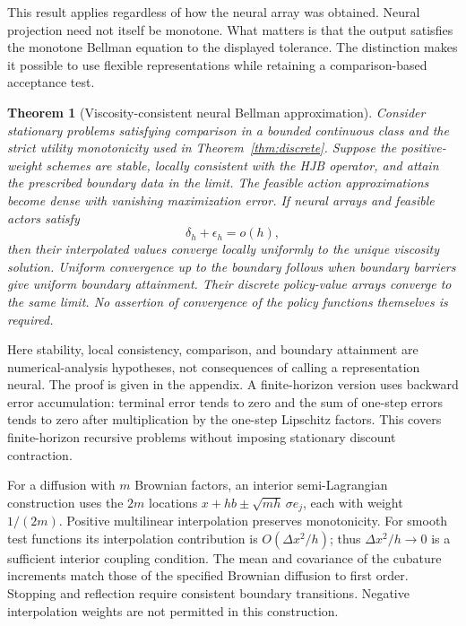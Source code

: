 \documentclass[ecta,nameyear,draft]{econsocart}
\newtheorem{theorem}{Theorem}
\theoremstyle{definition}
\theoremstyle{remark}
\begin{document}
This result applies regardless of how the neural array was obtained. Neural projection need not itself be monotone. What matters is that the output satisfies the monotone Bellman equation to the displayed tolerance. The distinction makes it possible to use flexible representations while retaining a comparison-based acceptance test.

\begin{theorem}[Viscosity-consistent neural Bellman approximation]\label{thm:viscosity}
Consider stationary problems satisfying comparison in a bounded continuous class and the strict utility monotonicity used in Theorem~\ref{thm:discrete}. Suppose the positive-weight schemes are stable, locally consistent with the HJB operator, and attain the prescribed boundary data in the limit. The feasible action approximations become dense with vanishing maximization error. If neural arrays and feasible actors satisfy
\begin{equation}\label{eq:scalederror}
 \delta_h+\epsilon_h=o(h),
\end{equation}
then their interpolated values converge locally uniformly to the unique viscosity solution. Uniform convergence up to the boundary follows when boundary barriers give uniform boundary attainment. Their discrete policy-value arrays converge to the same limit. No assertion of convergence of the policy functions themselves is required.
\end{theorem}

Here stability, local consistency, comparison, and boundary attainment are numerical-analysis hypotheses, not consequences of calling a representation neural. The proof is given in the appendix. A finite-horizon version uses backward error accumulation: terminal error tends to zero and the sum of one-step errors tends to zero after multiplication by the one-step Lipschitz factors. This covers finite-horizon recursive problems without imposing stationary discount contraction.

For a diffusion with $m$ Brownian factors, an interior semi-Lagrangian construction uses the $2m$ locations $x+h b\pm\sqrt{mh}\,\sigma e_j$, each with weight $1/(2m)$. Positive multilinear interpolation preserves monotonicity. For smooth test functions its interpolation contribution is $O(\Delta x^2/h)$; thus $\Delta x^2/h\to0$ is a sufficient interior coupling condition. The mean and covariance of the cubature increments match those of the specified Brownian diffusion to first order. Stopping and reflection require consistent boundary transitions. Negative interpolation weights are not permitted in this construction.
\end{document}
